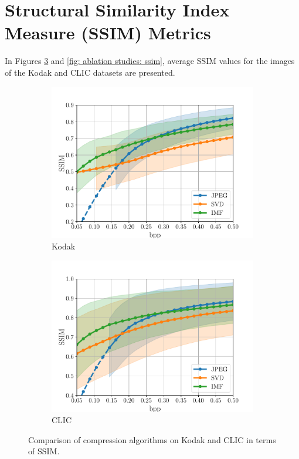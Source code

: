 \section{Structural Similarity Index Measure (SSIM) Metrics}
In Figures \ref{fig: compression_performance_ssim} and \ref{fig: ablation studies: ssim}, average SSIM values for the images of the Kodak and CLIC datasets are presented. 

\begin{figure}[t]
	\centering
	\begin{subfigure}{.45\textwidth}
		\centering
		\includegraphics[width=.95\textwidth]{figures/comparison_kodak_ssim.pdf}
		\caption{Kodak}
		\label{fig: ssim-vs-bpp kodak}
	\end{subfigure}%
	\begin{subfigure}{.45\textwidth}
		\centering
		\includegraphics[width=.95\textwidth]{figures/comparison_clic_ssim.pdf}
		\caption{CLIC}
		\label{fig: ssim-vs-bpp clic}
	\end{subfigure}
	\caption{Comparison of compression algorithms on Kodak and CLIC in terms of SSIM.}
	\label{fig: compression_performance_ssim}
\end{figure}

